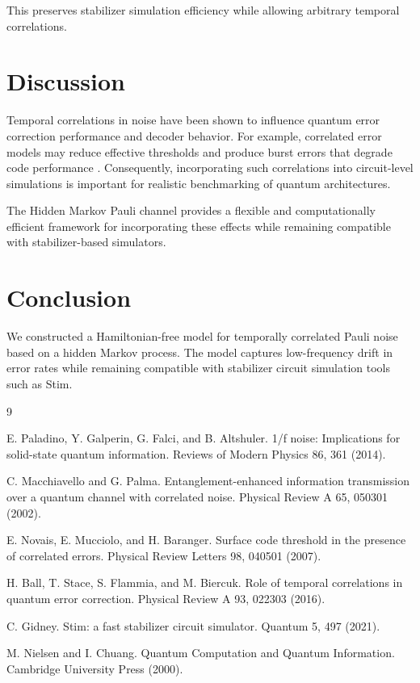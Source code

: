 \documentclass[11pt]{article}
\begin{document}
This preserves stabilizer simulation efficiency while allowing arbitrary temporal correlations.

\section{Discussion}

Temporal correlations in noise have been shown to influence quantum error correction performance and decoder behavior. 
For example, correlated error models may reduce effective thresholds and produce burst errors that degrade code performance \cite{novais2007,ball2016}. 
Consequently, incorporating such correlations into circuit-level simulations is important for realistic benchmarking of quantum architectures.

The Hidden Markov Pauli channel provides a flexible and computationally efficient framework for incorporating these effects while remaining compatible with stabilizer-based simulators.

\section{Conclusion}

We constructed a Hamiltonian-free model for temporally correlated Pauli noise based on a hidden Markov process. 
The model captures low-frequency drift in error rates while remaining compatible with stabilizer circuit simulation tools such as Stim.



\begin{thebibliography}{9}

E. Paladino, Y. Galperin, G. Falci, and B. Altshuler.
1/f noise: Implications for solid-state quantum information.
Reviews of Modern Physics 86, 361 (2014).

C. Macchiavello and G. Palma.
Entanglement-enhanced information transmission over a quantum channel with correlated noise.
Physical Review A 65, 050301 (2002).

E. Novais, E. Mucciolo, and H. Baranger.
Surface code threshold in the presence of correlated errors.
Physical Review Letters 98, 040501 (2007).

H. Ball, T. Stace, S. Flammia, and M. Biercuk.
Role of temporal correlations in quantum error correction.
Physical Review A 93, 022303 (2016).

C. Gidney.
Stim: a fast stabilizer circuit simulator.
Quantum 5, 497 (2021).

M. Nielsen and I. Chuang.
Quantum Computation and Quantum Information.
Cambridge University Press (2000).

\end{thebibliography}
\end{document}
